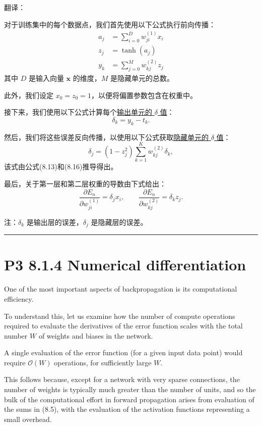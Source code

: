 \documentclass{article}
\begin{document}
{\color{red}
翻译：

对于训练集中的每个数据点，我们首先使用以下公式执行前向传播：
\begin{align} 
    a_j &= \sum_{i=0}^D w_{ji}^{(1)} x_i \tag{8.18} \\ 
    z_j &= \tanh(a_j) \tag{8.19} \\ 
    y_k &= \sum_{j=0}^M w_{kj}^{(2)} z_j \tag{8.20} 
\end{align}
其中 $D$ 是输入向量 $\mathbf{x}$ 的维度，$M$ 是隐藏单元的总数。

此外，我们设定 $x_0 = z_0 = 1$，以便将偏置参数包含在权重中。

接下来，我们使用以下公式计算每个\underline{输出单元的 $\delta$ 值}：
\begin{equation}
\delta_k = y_k - t_k. 
\tag{8.21}
\end{equation}

然后，我们将这些误差反向传播，以使用以下公式获取\underline{隐藏单元的 $\delta$ 值}：
\begin{equation}
\delta_j = (1 - z_j^2) \sum_{k=1}^K w_{kj}^{(2)} \delta_k, \tag{8.22}
\end{equation}
该式由公式(8.13)和(8.16)推导得出。

最后，关于第一层和第二层权重的导数由下式给出：
\begin{equation}
\frac{\partial E_n}{\partial w_{ji}^{(1)}} = \delta_j x_i, \qquad \frac{\partial E_n}{\partial w_{kj}^{(2)}} = \delta_k z_j. 
\tag{8.23}
\end{equation}
}

{\color{blue}
注：$\delta_k$ 是输出层的误差，$\delta_j$ 是隐藏层的误差。
}

\noindent\rule{\linewidth}{0.4pt}

\section{P3 8.1.4 Numerical differentiation}

One of the most important aspects of backpropagation is its computational efficiency. 

To understand this, let us examine how the number of compute operations required to evaluate the derivatives of the error function scales with the total number $W$ of weights and biases in the network.

A single evaluation of the error function (for a given input data point) would require $\mathcal{O}(W)$ operations, for sufficiently large $W$. 

This follows because, except for a network with very sparse connections, the number of weights is typically much greater than the number of units, and so the bulk of the computational effort in forward propagation arises from evaluation of the sums in (8.5), with the evaluation of the activation functions representing a small overhead. 
\end{document}
